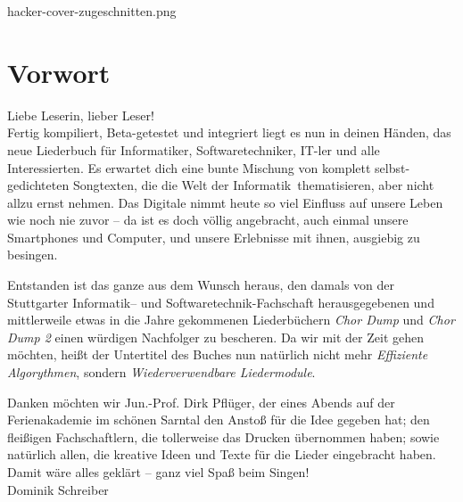 \documentclass[11pt,a5paper]{article}
\def\maketitle{
	\vspace*{1.4cm}
		\begin{overpic}[width=11cm]{hacker-cover-zugeschnitten.png}
		\end{overpic}
	}
\begin{document}
		
\maketitle
\thispagestyle{empty}
\pagebreak
\tableofcontents
\pagebreak

\small

\section*{Vorwort}

Liebe Leserin, lieber Leser! \\
			
Fertig kompiliert, Beta-getestet und integriert liegt es nun in deinen Händen, das neue Liederbuch für Informatiker, Softwaretechniker, IT-ler und alle Interessierten. 
Es erwartet dich eine bunte Mischung von komplett selbst-gedichteten Songtexten, die die \glqq Welt der Informatik\grqq \ thematisieren, aber nicht allzu ernst nehmen. Das Digitale nimmt heute so viel Einfluss auf unsere Leben wie noch nie zuvor -- da ist es doch völlig angebracht, auch einmal unsere Smartphones und Computer, und unsere Erlebnisse mit ihnen, ausgiebig zu besingen.

Entstanden ist das ganze aus dem Wunsch heraus, den damals von der Stuttgarter Informatik-- und Softwaretechnik-Fachschaft herausgegebenen und mittlerweile etwas in die Jahre gekommenen Liederbüchern \emph{Chor Dump} und \emph{Chor Dump 2} einen würdigen Nachfolger zu bescheren.
Da wir mit der Zeit gehen möchten, heißt der Untertitel des Buches nun natürlich nicht mehr \emph{Effiziente Algorythmen}, sondern \emph{Wiederverwendbare Liedermodule}.

Danken möchten wir Jun.-Prof. Dirk Pflüger, der eines Abends auf der Ferienakademie im schönen Sarntal den Anstoß für die Idee gegeben hat; den fleißigen Fachschaftlern, die tollerweise das Drucken übernommen haben; sowie natürlich allen, die kreative Ideen und Texte für die Lieder eingebracht haben. \\

Damit wäre alles geklärt -- ganz viel Spaß beim Singen! \\

\hfill Dominik Schreiber \\
\end{document}
